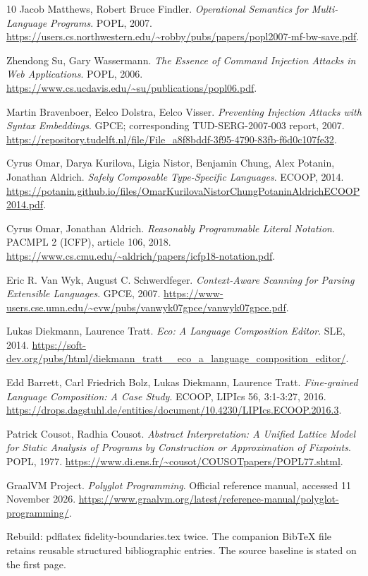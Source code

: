 \documentclass[11pt]{article}
\begin{document}
\begin{thebibliography}{10}\small
{} Jacob Matthews, Robert Bruce Findler. \emph{Operational Semantics for Multi-Language Programs}. POPL, 2007. \url{https://users.cs.northwestern.edu/~robby/pubs/papers/popl2007-mf-bw-save.pdf}.

 Zhendong Su, Gary Wassermann. \emph{The Essence of Command Injection Attacks in Web Applications}. POPL, 2006. \url{https://www.cs.ucdavis.edu/~su/publications/popl06.pdf}.

 Martin Bravenboer, Eelco Dolstra, Eelco Visser. \emph{Preventing Injection Attacks with Syntax Embeddings}. GPCE; corresponding TUD-SERG-2007-003 report, 2007. \url{https://repository.tudelft.nl/file/File_a8f8bddf-3f95-4790-83fb-f6d0c107fe32}.

 Cyrus Omar, Darya Kurilova, Ligia Nistor, Benjamin Chung, Alex Potanin, Jonathan Aldrich. \emph{Safely Composable Type-Specific Languages}. ECOOP, 2014. \url{https://potanin.github.io/files/OmarKurilovaNistorChungPotaninAldrichECOOP2014.pdf}.

 Cyrus Omar, Jonathan Aldrich. \emph{Reasonably Programmable Literal Notation}. PACMPL 2 (ICFP), article 106, 2018. \url{https://www.cs.cmu.edu/~aldrich/papers/icfp18-notation.pdf}.

 Eric R. Van Wyk, August C. Schwerdfeger. \emph{Context-Aware Scanning for Parsing Extensible Languages}. GPCE, 2007. \url{https://www-users.cse.umn.edu/~evw/pubs/vanwyk07gpce/vanwyk07gpce.pdf}.

 Lukas Diekmann, Laurence Tratt. \emph{Eco: A Language Composition Editor}. SLE, 2014. \url{https://soft-dev.org/pubs/html/diekmann_tratt__eco_a_language_composition_editor/}.

 Edd Barrett, Carl Friedrich Bolz, Lukas Diekmann, Laurence Tratt. \emph{Fine-grained Language Composition: A Case Study}. ECOOP, LIPIcs 56, 3:1-3:27, 2016. \url{https://drops.dagstuhl.de/entities/document/10.4230/LIPIcs.ECOOP.2016.3}.

 Patrick Cousot, Radhia Cousot. \emph{Abstract Interpretation: A Unified Lattice Model for Static Analysis of Programs by Construction or Approximation of Fixpoints}. POPL, 1977. \url{https://www.di.ens.fr/~cousot/COUSOTpapers/POPL77.shtml}.

 GraalVM Project. \emph{Polyglot Programming}. Official reference manual, accessed 11 November 2026. \url{https://www.graalvm.org/latest/reference-manual/polyglot-programming/}.

\end{thebibliography}
Rebuild: pdflatex fidelity-boundaries.tex twice. The companion BibTeX file retains reusable structured bibliographic entries. The source baseline is stated on the first page.
\end{document}
